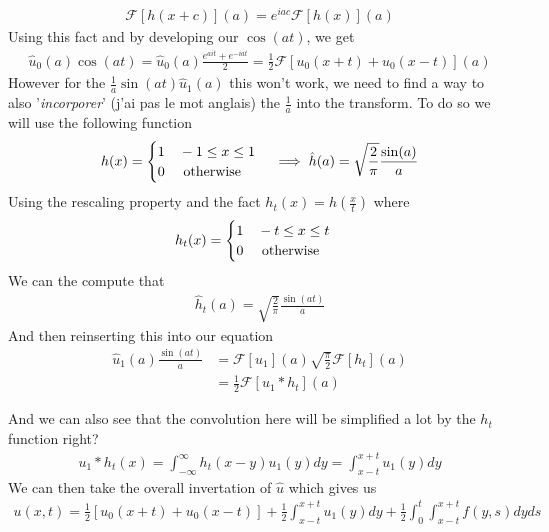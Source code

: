 \begin{align*} 
	\mathcal{F}\left[h\left(x + c\right)\right]\left(a\right) = e^{iac}\mathcal{F}\left[h\left(x\right)\right]\left(a\right)
\end{align*}
Using this fact and by developing our $\cos\left(at\right)$, we get 
\begin{align*} 
	\hat{u}_0\left(a\right)\cos\left(at\right) = \hat{u}_0\left(a\right)\frac{e^{ait} + e^{-iat}}{2} = \frac{1}{2}\mathcal{F}\left[u_0\left(x + t\right) + u_0\left(x -t\right)\right]\left(a\right)
\end{align*}
However for the $\frac{1}{a}\sin\left(at\right)\hat{u}_1\left(a\right)$ this won't work, we need to find a way to also  '\textit{incorporer}' (j'ai pas le mot anglais) the $\frac{1}{a}$ into the transform. To do so we will use the following function 
\begin{align*} 
	h\left(x\right) = \begin{cases}
		1 \mathspace -1 \leq x \leq 1 \\ 0 \mathspace \text{ otherwise }
	\end{cases}  \implies \hat{h}\left(a\right) = \sqrt{\frac{2}{\pi}}\frac{\sin\left(a\right)}{a}
\end{align*}
Using the rescaling property and the fact $h_t\left(x\right) = h\left(\frac{x}{t}\right)$ where 
\begin{align*} 
	h_t\left(x\right) = \begin{cases}
		1 \mathspace -t \leq x \leq t \\ 0 \mathspace \text{ otherwise}
	\end{cases} 
\end{align*}
We can the compute that
\begin{align*} 
	\hat{h}_t\left(a\right) = \sqrt{\frac{2}{\pi}}\frac{\sin\left(at\right)}{a}
\end{align*}
And then reinserting this into our equation 
\begin{align*} 
	\hat{u}_1\left(a\right)\frac{\sin\left(at\right)}{a} &= \mathcal{F}\left[u_1\right]\left(a\right)\sqrt{\frac{\pi}{2}}\mathcal{F}\left[h_t\right]\left(a\right)\\
	&= \frac{1}{2}\mathcal{F}\left[u_1 \ast h_t\right]\left(a\right)
\end{align*}

And we can also see that the convolution here will be simplified a lot by the $h_t$ function right?
\begin{align*} 
	u_1 \ast h_t \left(x\right) = \int_{-\infty}^{\infty}h_t\left(x - y\right)u_1\left(y\right)dy = \int_{x-t}^{x + t}u_1\left(y\right)dy
\end{align*}
We can then take the overall invertation of $\hat{u}$ which gives us 
\begin{align*} 
	u\left(x, t\right) = \frac{1}{2}\left[u_0\left(x + t\right) + u_0\left(x -t\right)\right] + \frac{1}{2}\int_{x-t}^{x + t}u_1\left(y\right)dy + \frac{1}{2}\int_0^{t}\int_{x-t}^{x + t}f\left(y, s\right)dyds
\end{align*}



